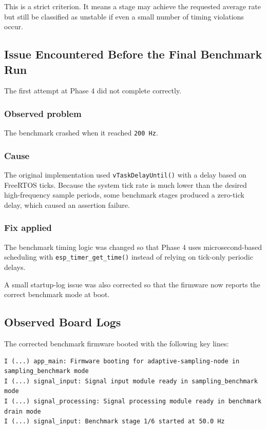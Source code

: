 \documentclass[12pt,a4paper]{article}
\begin{document}
This is a strict criterion. It means a stage may achieve the requested average
rate but still be classified as unstable if even a small number of timing
violations occur.

\subsection{Issue Encountered Before the Final Benchmark Run}

The first attempt at Phase 4 did not complete correctly.

\subsubsection*{Observed problem}

The benchmark crashed when it reached \texttt{200 Hz}.

\subsubsection*{Cause}

The original implementation used \texttt{vTaskDelayUntil()} with a delay based
on FreeRTOS ticks. Because the system tick rate is much lower than the desired
high-frequency sample periods, some benchmark stages produced a zero-tick delay,
which caused an assertion failure.

\subsubsection*{Fix applied}

The benchmark timing logic was changed so that Phase 4 uses microsecond-based
scheduling with \texttt{esp\_timer\_get\_time()} instead of relying on tick-only
periodic delays.

A small startup-log issue was also corrected so that the firmware now reports
the correct benchmark mode at boot.

\subsection{Observed Board Logs}

The corrected benchmark firmware booted with the following key lines:

\begin{lstlisting}
I (...) app_main: Firmware booting for adaptive-sampling-node in sampling_benchmark mode
I (...) signal_input: Signal input module ready in sampling_benchmark mode
I (...) signal_processing: Signal processing module ready in benchmark drain mode
I (...) signal_input: Benchmark stage 1/6 started at 50.0 Hz
\end{lstlisting}
\end{document}
